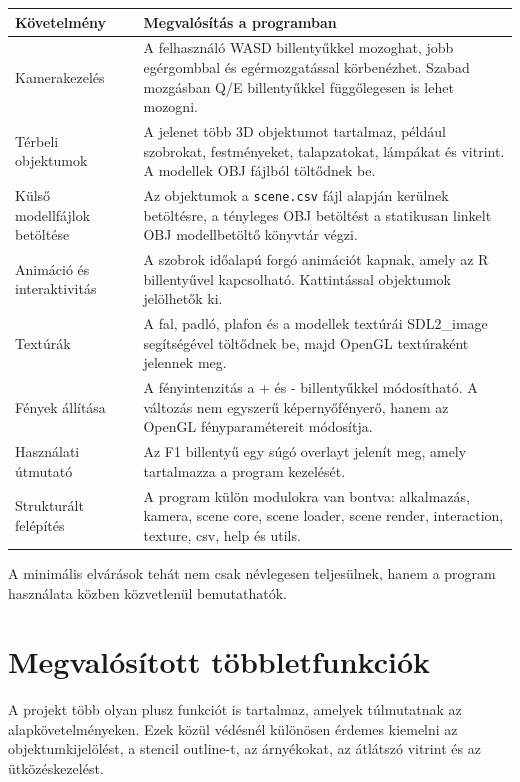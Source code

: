 \documentclass[12pt,a4paper]{article}
\newcommand{\code}[1]{\texttt{#1}}
\begin{document}
\begin{longtable}{p{} p{}}
\toprule
\textbf{Követelmény} & \textbf{Megvalósítás a programban} \\
\midrule
Kamerakezelés & A felhasználó WASD billentyűkkel mozoghat, jobb egérgombbal és egérmozgatással körbenézhet. Szabad mozgásban Q/E billentyűkkel függőlegesen is lehet mozogni. \\
\midrule
Térbeli objektumok & A jelenet több 3D objektumot tartalmaz, például szobrokat, festményeket, talapzatokat, lámpákat és vitrint. A modellek OBJ fájlból töltődnek be. \\
\midrule
Külső modellfájlok betöltése & Az objektumok a \code{scene.csv} fájl alapján kerülnek betöltésre, a tényleges OBJ betöltést a statikusan linkelt OBJ modellbetöltő könyvtár végzi. \\
\midrule
Animáció és interaktivitás & A szobrok időalapú forgó animációt kapnak, amely az R billentyűvel kapcsolható. Kattintással objektumok jelölhetők ki. \\
\midrule
Textúrák & A fal, padló, plafon és a modellek textúrái SDL2\_image segítségével töltődnek be, majd OpenGL textúraként jelennek meg. \\
\midrule
Fények állítása & A fényintenzitás a + és - billentyűkkel módosítható. A változás nem egyszerű képernyőfényerő, hanem az OpenGL fényparamétereit módosítja. \\
\midrule
Használati útmutató & Az F1 billentyű egy súgó overlayt jelenít meg, amely tartalmazza a program kezelését. \\
\midrule
Strukturált felépítés & A program külön modulokra van bontva: alkalmazás, kamera, scene core, scene loader, scene render, interaction, texture, csv, help és utils. \\
\bottomrule
\end{longtable}

A minimális elvárások tehát nem csak névlegesen teljesülnek, hanem a program használata közben közvetlenül bemutathatók.

\section{Megvalósított többletfunkciók}

A projekt több olyan plusz funkciót is tartalmaz, amelyek túlmutatnak az alapkövetelményeken. Ezek közül védésnél különösen érdemes kiemelni az objektumkijelölést, a stencil outline-t, az árnyékokat, az átlátszó vitrint és az ütközéskezelést.
\end{document}
